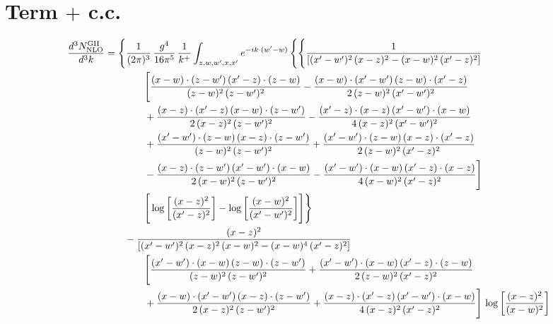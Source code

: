 \documentclass[10pt]{article}
\begin{document}
\section{Term $+$ c.c.}
\begin{align}
\frac{d^{3}N^{\rm GII}_{\rm NLO}}{d^{3}k}&=\Bigg\{\frac{1}{(2\pi)^{3}}\,\frac{g^{4}}{16\pi^{5}}\,\frac{1}{k^{+}}\int_{z,w,w^{\prime},x,x^{\prime}}e^{-ik\cdot(w^{\prime}-w)}\,\Bigg\{\Bigg\{ \frac{1}{\left[(x^{\prime}-w^{\prime})^{2}\, (x-z)^{2}-(x-w)^{2}\, (x^{\prime}-z)^{2}\right]}\,\notag\\&\qquad\qquad  \Bigg[\frac{(x-w)\cdot (z-w^{\prime})\, (x^{\prime}-z)\cdot (z-w)}{(z-w)^{2}\,(z-w^{\prime})^{2}}-\frac{(x-w)\cdot (x^{\prime}-w^{\prime})\, (z-w)\cdot (x^{\prime}-z)}{2\, (z-w)^{2}\, (x^{\prime}-w^{\prime})^{2}}\notag\\&\qquad\qquad  + \frac{(x-z)\cdot (x^{\prime}-z)\, (x-w)\cdot (z-w^{\prime})}{2\, (x-z)^{2}\, (z-w^{\prime})^{2}}-\frac{(x^{\prime}-z)\cdot (x-z)\, (x^{\prime}-w^{\prime})\cdot (x-w)}{4\, (x-z)^{2}\, (x^{\prime}-w^{\prime})^{2}}\notag\\&\qquad\qquad  + \frac{(x^{\prime}-w^{\prime})\cdot (z-w)\, (x-z)\cdot (z-w^{\prime})}{(z-w)^{2}\,(z-w^{\prime})^{2}}+\frac{(x^{\prime}-w^{\prime})\cdot (z-w)\, (x-z)\cdot (x^{\prime}-z)}{2\, (z-w)^{2}\, (x^{\prime}-z)^{2}}\notag\\&\qquad\qquad  - \frac{(x-z)\cdot (z-w^{\prime})\, (x^{\prime}-w^{\prime})\cdot (x-w)}{2\, (x-w)^{2}\, (z-w^{\prime})^{2}} -\frac{(x^{\prime}-w^{\prime})\cdot (x-w)\, (x^{\prime}-z)\cdot (x-z)}{4\, (x-w)^{2}\, (x^{\prime}-z)^{2}}\Bigg]\notag\\&\qquad\qquad   \Bigg[\log{\left[\frac{(x-z)^{2}}{ (x^{\prime}-z)^{2}}\right]}-\log{\left[\frac{(x-w)^{2}}{(x^{\prime}-w^{\prime})^{2}}\right]}\Bigg]\Bigg\}\notag\\
&\qquad-\frac{(x-z)^{2}}{\left[(x^{\prime}-w^{\prime})^{2}\,(x-z)^{2}\,(x-w)^{2} - (x-w)^{4}\, (x^{\prime}-z)^{2}\right]}\,  \notag\\&\qquad\qquad  \Bigg[\frac{(x^{\prime}-w^{\prime})\cdot (x-w)\, (z-w)\cdot (z-w^{\prime})}{(z-w)^{2}\, (z-w^{\prime})^{2}}+\frac{(x^{\prime}-w^{\prime})\cdot (x-w)\, (x^{\prime}-z)\cdot (z-w)}{2\, (z-w)^{2}\, (x^{\prime}-z)^{2}}\notag\\&\qquad\qquad  +\frac{(x-w)\cdot (x^{\prime}-w^{\prime})\, (x-z)\cdot (z-w^{\prime})}{2\, (x-z)^{2}\, (z-w^{\prime})^{2}}+\frac{(x-z)\cdot (x^{\prime}-z)\, (x^{\prime}-w^{\prime})\cdot (x-w)}{4\, (x-z)^{2}\, (x^{\prime}-z)^{2}}\Bigg] \,\log{\left[\frac{(x-z)^{2}}{(x-w)^{2}}\right]}\notag\\

\end{align}
\end{document}
